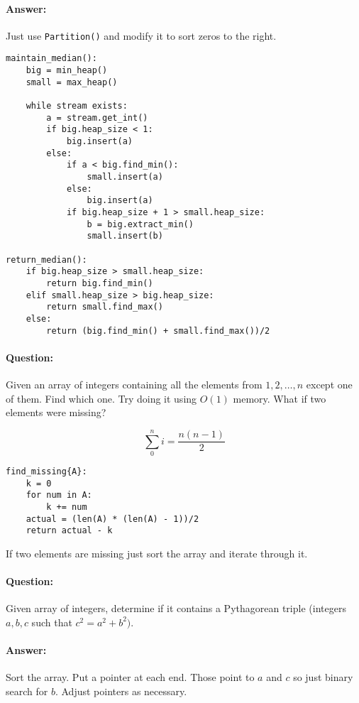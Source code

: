 \documentclass{article}
\newcommand{\code}[1]{\texttt{#1}}
\begin{document}
\paragraph{Answer:} Just use \code{Partition()} and modify it to sort zeros to the right.


\begin{lstlisting}
maintain_median():
    big = min_heap()
    small = max_heap()

    while stream exists:
        a = stream.get_int()
        if big.heap_size < 1:
            big.insert(a)
        else:
            if a < big.find_min():
                small.insert(a)
            else:
                big.insert(a)
            if big.heap_size + 1 > small.heap_size:
                b = big.extract_min()
                small.insert(b)

return_median():
    if big.heap_size > small.heap_size:
        return big.find_min()
    elif small.heap_size > big.heap_size:
        return small.find_max()
    else:
        return (big.find_min() + small.find_max())/2
\end{lstlisting}

\paragraph{Question:} Given an array of integers containing all the elements from \(1, 2, \ldots , n\) except one of them. Find which one. Try doing it using \(O(1)\) memory. What if two elements were missing?

\[\sum_0^n i = \frac{n(n-1)}{2}\]

\begin{lstlisting}
find_missing{A}:
    k = 0
    for num in A:
        k += num
    actual = (len(A) * (len(A) - 1))/2
    return actual - k
\end{lstlisting}

If two elements are missing just sort the array and iterate through it.

\paragraph{Question:} Given array of integers, determine if it contains a Pythagorean triple (integers \(a, b, c\) such that \(c^2 = a^2 + b^2)\).

\paragraph{Answer:} Sort the array. Put a pointer at each end. Those point to \(a\) and \(c\) so just binary search for \(b\). Adjust pointers as necessary.
\end{document}
